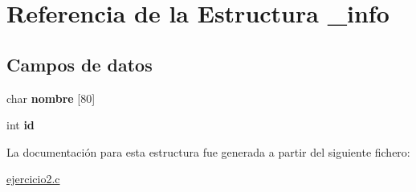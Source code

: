 \hypertarget{struct__info}{}\section{Referencia de la Estructura \+\_\+info}
\label{struct__info}
\subsection*{Campos de datos}
\begin{DoxyCompactItemize}
\item 
char {\bfseries nombre} \mbox{[}80\mbox{]}\hypertarget{struct__info_acdcd46bce5e23ab67113d7de0033169d}{}\label{struct__info_acdcd46bce5e23ab67113d7de0033169d}

\item 
int {\bfseries id}\hypertarget{struct__info_aad251c67a1f0bce28b975a9d36fc0f4a}{}\label{struct__info_aad251c67a1f0bce28b975a9d36fc0f4a}

\end{DoxyCompactItemize}


La documentación para esta estructura fue generada a partir del siguiente fichero\+:\begin{DoxyCompactItemize}
\item 
\hyperlink{ejercicio2_8c}{ejercicio2.\+c}\end{DoxyCompactItemize}
